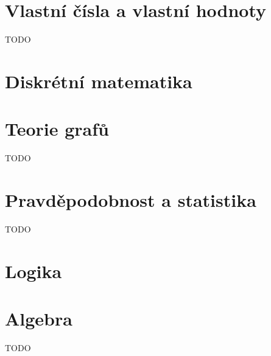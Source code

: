 \section{Vlastní čísla a vlastní hodnoty}
TODO

\section{Diskrétní matematika}


\section{Teorie grafů}
TODO

\section{Pravděpodobnost a statistika}
TODO

\section{Logika}


\section{Algebra}
TODO

